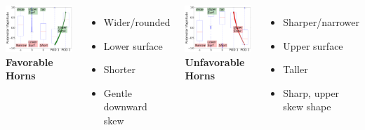 \documentclass[9pt]{beamer}
\begin{document}
\begin{frame}
\begin{columns}[c]
    \centering
    \includegraphics[width=1\textwidth]{GoodHornParamLocs.png} \\
    {\bf Favorable Horns}
    \begin{itemize}
      \item Wider/rounded
      \item Lower surface
      \item Shorter
      \item Gentle downward skew
    \end{itemize}
    \centering
    \includegraphics[width=1\textwidth]{BadHornParamLocs.png} \\
    {\bf Unfavorable Horns}
    \begin{itemize}
      \item Sharper/narrower
      \item Upper surface
      \item Taller
      \item Sharp, upper skew shape
    \end{itemize}
\end{columns}
\end{frame}
\end{document}
